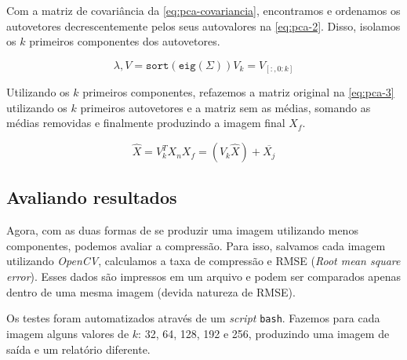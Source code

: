 \documentclass[brazilian,a4paper,twocolumn]{article}
\begin{document}
        Com a matriz de covariância da \cref{eq:pca-covariancia}, encontramos e ordenamos os autovetores decrescentemente pelos seus autovalores na \cref{eq:pca-2}. Disso, isolamos os $k$ primeiros componentes dos autovetores.

        \begin{subequations}
            \label{eq:pca-2}
            \begin{equation}
                \label{eq:pca-autovalorvetor}
                \lambda, V = \texttt{sort}(\texttt{eig}(\Sigma))
            \end{equation}
            \begin{equation}
                \label{eq:pca-autovetor-k}
                V_k = V_{[:, 0:k]}
            \end{equation}
        \end{subequations}

        Utilizando os $k$ primeiros componentes, refazemos a matriz original na \cref{eq:pca-3} utilizando os $k$ primeiros autovetores e a matriz sem as médias, somando as médias removidas e finalmente produzindo a imagem final $X_f$.

        \begin{subequations}
            \label{eq:pca-3}
            \begin{equation}
                \label{eq:pca-saida}
                \hat{X} = V^T_k X_n
            \end{equation}
            \begin{equation}
                \label{eq:pca-recomposicao}
                X_f = (V_k \hat{X}) + \overline{X_j}
            \end{equation}
        \end{subequations}


    \subsection{Avaliando resultados}

        Agora, com as duas formas de se produzir uma imagem utilizando menos componentes, podemos avaliar a compressão. Para isso, salvamos cada imagem utilizando \emph{OpenCV}, calculamos a taxa de compressão e RMSE (\textit{Root mean square error}). Esses dados são impressos em um arquivo e podem ser comparados apenas dentro de uma mesma imagem (devida natureza de RMSE).

        Os testes foram automatizados através de um \textit{script} \texttt{bash}. Fazemos para cada imagem alguns valores de $k$: 32, 64, 128, 192 e 256, produzindo uma imagem de saída e um relatório diferente.
\end{document}
